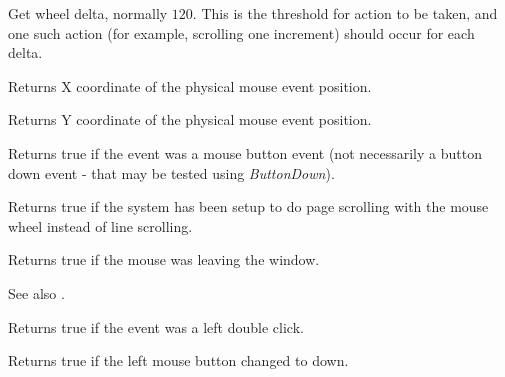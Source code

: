 \label{wxmouseeventgetwheeldelta}


Get wheel delta, normally $120$.  This is the threshold for action to be
taken, and one such action (for example, scrolling one increment)
should occur for each delta.


\label{wxmouseeventgetx}


Returns X coordinate of the physical mouse event position.


\label{wxmouseeventgety}


Returns Y coordinate of the physical mouse event position.


\label{wxmouseeventisbutton}


Returns true if the event was a mouse button event (not necessarily a button down event -
that may be tested using {\it ButtonDown}).


\label{wxmouseeventispagescroll}


Returns true if the system has been setup to do page scrolling with
the mouse wheel instead of line scrolling.


\label{wxmouseeventleaving}


Returns true if the mouse was leaving the window.

See also .


\label{wxmouseeventleftdclick}


Returns true if the event was a left double click.


\label{wxmouseeventleftdown}


Returns true if the left mouse button changed to down.


\label{wxmouseeventleftisdown}

